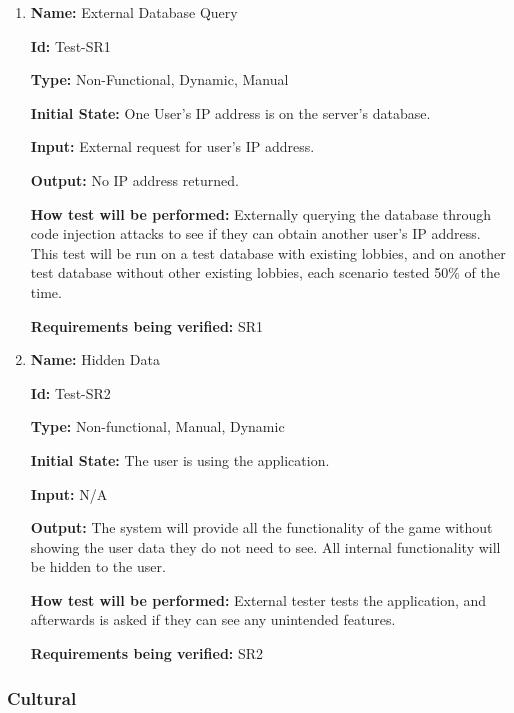 \documentclass[12pt, titlepage]{article}
\begin{document}
\begin{enumerate}

\item{\textbf{Name:} External Database Query} \label{itm:Test-SR1}

\textbf{Id:} Test-SR1

\textbf{Type:} Non-Functional, Dynamic, Manual
					
\textbf{Initial State:} One User's IP address is on the server's database.
					
\textbf{Input:} External request for user's IP address.
					
\textbf{Output:} No IP address returned.
					
\textbf{How test will be performed:} Externally querying the database through code injection attacks to see if they can obtain another user's IP address. This test will be run on a test database with existing lobbies, and on another test database without other existing lobbies, each scenario tested 50\% of the time.

\textbf{Requirements being verified:} SR1
					
\item{\textbf{Name:} Hidden Data} \label{itm:Test-SR2}

\textbf{Id:} Test-SR2

\textbf{Type:} Non-functional, Manual, Dynamic
					
\textbf{Initial State:} The user is using the application.
					
\textbf{Input:} N/A
					
\textbf{Output:} The system will provide all the functionality of the game without showing the user data they do not need to see. All internal functionality will be hidden to the user.
					
\textbf{How test will be performed:} External tester tests the application, and afterwards is asked if they can see any unintended features.

\textbf{Requirements being verified:} SR2

\end{enumerate}

\subsubsection{Cultural}
\end{document}
